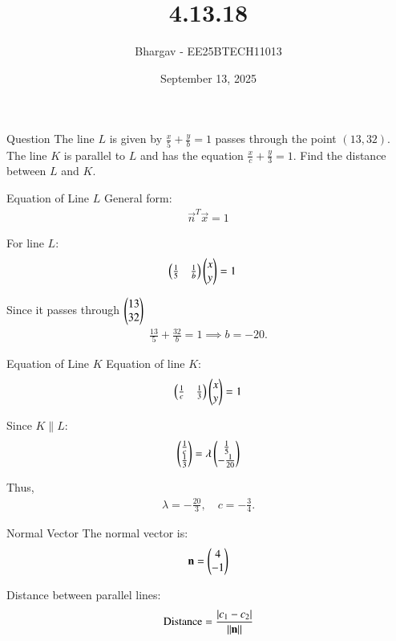 \documentclass{beamer}
\title{4.13.18}
\date{September 13, 2025}
\author{Bhargav - EE25BTECH11013}
\begin{document}
\frame{\titlepage}

\begin{frame}{Question}
The line $L$ is given by $\frac{x}{5} + \frac{y}{b} = 1$
passes through the point $(13,32)$. \\
The line $K$ is parallel to $L$ and has the equation
$\frac{x}{c} + \frac{y}{3} = 1.$
Find the distance between $L$ and $K$.
\end{frame}

\begin{frame}{Equation of Line $L$}
General form:
\begin{align}
\vec{n}^T \vec{x} = 1
\end{align}

For line $L$:
\begin{align}
\begin{pmatrix}\frac{1}{5} & \frac{1}{b}\end{pmatrix}\begin{pmatrix}x \\ y\end{pmatrix} &= 1
\end{align}

Since it passes through $\begin{pmatrix}13 \\ 32\end{pmatrix}$
\begin{align}
\frac{13}{5} + \frac{32}{b} = 1 \implies b = -20.
\end{align}
\end{frame}

\begin{frame}{Equation of Line $K$}
Equation of line $K$:
\begin{align}
\begin{pmatrix}\frac{1}{c} & \frac{1}{3}\end{pmatrix}\begin{pmatrix}x \\ y\end{pmatrix} = 1
\end{align}

Since $K \parallel L$:
\begin{align}
\begin{pmatrix}\frac{1}{c} \\ \frac{1}{3}\end{pmatrix} = \lambda \begin{pmatrix}\frac{1}{5} \\ -\frac{1}{20}\end{pmatrix}
\end{align}

Thus,
\begin{align}
\lambda = -\frac{20}{3}, \quad c = -\frac{3}{4}.
\end{align}
\end{frame}

\begin{frame}{Normal Vector}
The normal vector is:
\begin{align}
\mathbf{n} = \begin{pmatrix}4 \\ -1\end{pmatrix}
\end{align}


Distance between parallel lines:
\begin{align}
\text{Distance} = \frac{\left\vert c_1 - c_2\right\vert}{\left\lVert\mathbf{n}\right\rVert}
\end{align}
\end{frame}
\end{document}
